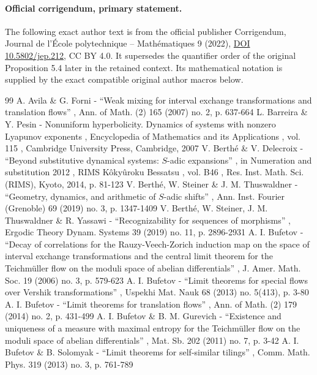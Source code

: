 \documentclass[11pt]{article}
\numberwithin{equation}{section}\newcommand{\Relation}[2][]{}\newtheorem*{prop*}{Proposition}
\begin{document}
\paragraph{Official corrigendum, primary statement.}
The following exact author text is from the official publisher Corrigendum, Journal de l'École polytechnique -- Mathématiques 9 (2022), \href{https://jep.centre-mersenne.org/articles/10.5802/jep.212/}{DOI 10.5802/jep.212}, CC BY 4.0. It supersedes the quantifier order of the original Proposition 5.4 later in the retained context. Its mathematical notation is supplied by the exact compatible original author macros below.

\clearpage

\begin{thebibliography}{99}
 A. Avila \& G. Forni - “Weak mixing for interval exchange transformations and translation flows” , Ann. of Math. (2) 165 (2007) no. 2, p. 637-664
 L. Barreira \& Y. Pesin - Nonuniform hyperbolicity. Dynamics of systems with nonzero Lyapunov exponents , Encyclopedia of Mathematics and its Applications , vol. 115 , Cambridge University Press, Cambridge, 2007
 V. Berthé \& V. Delecroix - “Beyond substitutive dynamical systems: $S$-adic expansions” , in Numeration and substitution 2012 , RIMS Kôkyûroku Bessatsu , vol. B46 , Res. Inst. Math. Sci. (RIMS), Kyoto, 2014, p. 81-123
 V. Berthé, W. Steiner \& J. M. Thuswaldner - “Geometry, dynamics, and arithmetic of $S$-adic shifts” , Ann. Inst. Fourier (Grenoble) 69 (2019) no. 3, p. 1347-1409
 V. Berthé, W. Steiner, J. M. Thuswaldner \& R. Yassawi - “Recognizability for sequences of morphisms” , Ergodic Theory Dynam. Systems 39 (2019) no. 11, p. 2896-2931
 A. I. Bufetov - “Decay of correlations for the Rauzy-Veech-Zorich induction map on the space of interval exchange transformations and the central limit theorem for the Teichmüller flow on the moduli space of abelian differentials” , J. Amer. Math. Soc. 19 (2006) no. 3, p. 579-623
 A. I. Bufetov - “Limit theorems for special flows over Vershik transformations” , Uspekhi Mat. Nauk 68 (2013) no. 5(413), p. 3-80
 A. I. Bufetov - “Limit theorems for translation flows” , Ann. of Math. (2) 179 (2014) no. 2, p. 431-499
 A. I. Bufetov \& B. M. Gurevich - “Existence and uniqueness of a measure with maximal entropy for the Teichmüller flow on the moduli space of abelian differentials” , Mat. Sb. 202 (2011) no. 7, p. 3-42
 A. I. Bufetov \& B. Solomyak - “Limit theorems for self-similar tilings” , Comm. Math. Phys. 319 (2013) no. 3, p. 761-789

\end{thebibliography}
\end{document}
